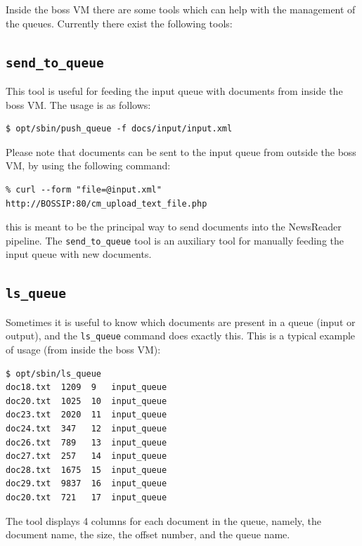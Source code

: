 \documentclass[a4]{article}
\newcommand{\todo}[1]{\textcolor{red}{\noindent$\rightarrow$ TODO: #1}}
\begin{document}
Inside the boss VM there are some tools which can help with the management
of the queues. Currently there exist the following tools:

\subsection*{\texttt{send\_to\_queue}}
\label{sec:send-to-queue.pl}

This tool is useful for feeding the input queue with documents from inside
the \textrm{boss} VM. The usage is as follows:

\begin{verbatim}
$ opt/sbin/push_queue -f docs/input/input.xml
\end{verbatim}

Please note that documents can be sent to the input queue from outside the
\textrm{boss} VM, by using the following command:

\begin{verbatim}
% curl --form "file=@input.xml" http://BOSSIP:80/cm_upload_text_file.php
\end{verbatim}


\noindent this is meant to be the principal way to send documents into the
NewsReader pipeline. The \texttt{send\_to\_queue} tool is an auxiliary tool
for manually feeding the input queue with new documents.

\subsection*{\texttt{ls\_queue}}
\label{sec:ls_queue}

Sometimes it is useful to know which documents are present in a queue (input
or output), and the \texttt{ls\_queue} command does exactly this. This is a
typical example of usage (from inside the \textrm{boss} VM):

\begin{verbatim}
$ opt/sbin/ls_queue
doc18.txt  1209  9   input_queue
doc20.txt  1025  10  input_queue
doc23.txt  2020  11  input_queue
doc24.txt  347   12  input_queue
doc26.txt  789   13  input_queue
doc27.txt  257   14  input_queue
doc28.txt  1675  15  input_queue
doc29.txt  9837  16  input_queue
doc20.txt  721   17  input_queue
\end{verbatim}

The tool displays 4 columns for each document in the queue, namely, the
document name, the size, the offset number, and the queue name.
\end{document}
